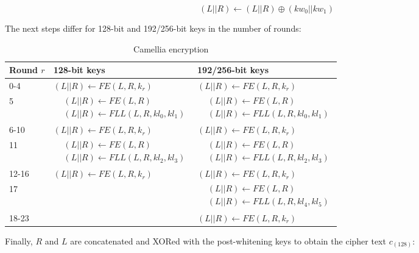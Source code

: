 \[
    (L||R)\leftarrow (L||R)\oplus (kw_0||kw_1)
\]

The next steps differ for 128-bit and 192/256-bit keys in the number of rounds:

\begin{table}[h!]
    \centering
    \caption{Camellia encryption}
    \begin{tabular}{lll}
        \toprule
        Round $r$ & 128-bit keys & 192/256-bit keys \\
        \midrule
        0-4 & $(L||R)\leftarrow FE(L,R,k_r)$ & $(L||R)\leftarrow FE(L,R,k_r)$ \\
        \midrule
        5 & {$\!\begin{aligned}&(L||R)\leftarrow FE(L,R)\\&(L||R)\leftarrow FLL(L,R,kl_0,kl_1)\end{aligned}$} & {$\!\begin{aligned}&(L||R)\leftarrow FE(L,R)\\&(L||R)\leftarrow FLL(L,R,kl_0,kl_1)\end{aligned}$} \\
        \midrule
        6-10 & $(L||R)\leftarrow FE(L,R,k_r)$ & $(L||R)\leftarrow FE(L,R,k_r)$ \\
        \midrule
        11 & {$\!\begin{aligned}&(L||R)\leftarrow FE(L,R)\\&(L||R)\leftarrow FLL(L,R,kl_2,kl_3)\end{aligned}$} & {$\!\begin{aligned}&(L||R)\leftarrow FE(L,R)\\&(L||R)\leftarrow FLL(L,R,kl_2,kl_3)\end{aligned}$} \\
        \midrule
        12-16 & $(L||R)\leftarrow FE(L,R,k_r)$ & $(L||R)\leftarrow FE(L,R,k_r)$ \\
        \midrule
        17 & & {$\!\begin{aligned}&(L||R)\leftarrow FE(L,R)\\&(L||R)\leftarrow FLL(L,R,kl_4,kl_5)\end{aligned}$} \\
        \midrule
        18-23 & & $(L||R)\leftarrow FE(L,R,k_r)$ \\
        \bottomrule
    \end{tabular}
\end{table}

Finally, $R$ and $L$ are concatenated and XORed with the post-whitening keys to
obtain the cipher text $c_{(128)}$:


